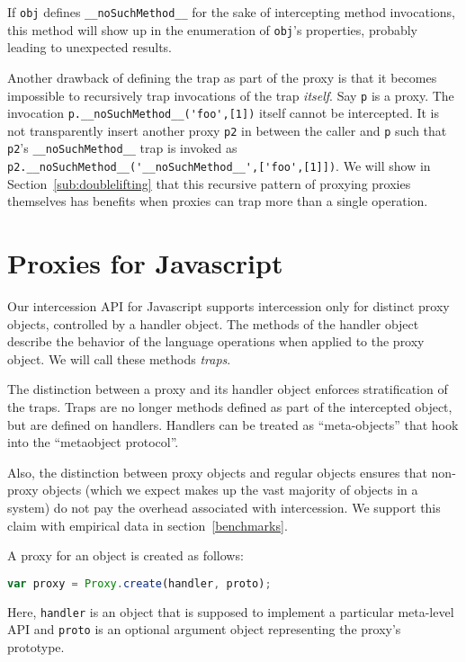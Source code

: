 \documentclass{acm_proc_article-sp}
\begin{document}
If \texttt{obj} defines \texttt{__noSuchMethod__} for the sake of intercepting method invocations, this method will show up in the enumeration of \texttt{obj}'s properties, probably leading to unexpected results.

Another drawback of defining the trap as part of the proxy is that it becomes impossible to recursively trap invocations of the trap \emph{itself}. Say \texttt{p} is a proxy. The invocation \lstinline{p.__noSuchMethod__('foo',[1])} itself cannot be intercepted. It is not transparently insert another proxy \texttt{p2} in between the caller and \texttt{p} such that \texttt{p2}'s \texttt{__noSuchMethod__} trap is invoked as \lstinline{p2.__noSuchMethod__('__noSuchMethod__',['foo',[1]])}. We will show in Section~\ref{sub:doublelifting} that this recursive pattern of proxying proxies themselves has benefits when proxies can trap more than a single operation.

\section{Proxies for Javascript}
\label{sec:proxies_for_javascript}

Our intercession API for Javascript supports intercession only for distinct proxy objects, controlled by a handler object. The methods of the handler object describe the behavior of the language operations when applied to the proxy object. We will call these methods \emph{traps}.

The distinction between a proxy and its handler object enforces stratification of the traps. Traps are no longer methods defined as part of the intercepted object, but are defined on handlers. Handlers can be treated as ``meta-objects'' that hook into the ``metaobject protocol''.

Also, the distinction between proxy objects and regular objects ensures that non-proxy objects (which we expect makes up the vast majority of objects in a system) do not pay the overhead associated with intercession. We support this claim with empirical data in section~\ref{benchmarks}.

A proxy for an object is created as follows:

\begin{lstlisting}[language=javascript]
var proxy = Proxy.create(handler, proto);
\end{lstlisting}

Here, \texttt{handler} is an object that is supposed to implement a particular meta-level API and \texttt{proto} is an optional argument object representing the proxy's prototype.
\end{document}
